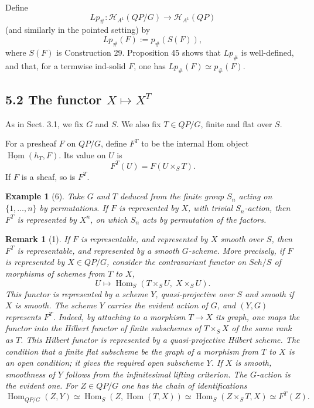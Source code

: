 \documentclass[11pt]{article}
\newcommand{\Hom}{\operatorname{Hom}}
\newcommand{\Ho}{\mathcal H}
\theoremstyle{deligne}
\newtheorem*{remark*}{Remark}
\newtheorem*{example*}{Example}
\begin{document}
Define
\[
Lp_\#:\Ho_{A^1}(QP/G)\longrightarrow \Ho_{A^1}(QP)
\]
(and similarly in the pointed setting) by
\[
Lp_\#(F):=p_\#(S(F)),
\]
where \(S(F)\) is Construction 29. Proposition 45 shows that \(Lp_\#\) is well-defined, and that, for a termwise ind-solid \(F\), one has \(Lp_\#(F)\simeq p_\#(F)\).

\subsection*{5.2 The functor \(X\mapsto X^T\)}

As in Sect. 3.1, we fix \(G\) and \(S\). We also fix \(T\in QP/G\), finite and flat over \(S\).

For a presheaf \(F\) on \(QP/G\), define \(F^T\) to be the internal Hom object \(\underline{\Hom}(h_T,F)\). Its value on \(U\) is
\[
F^T(U)=F(U\times_S T).
\]
If \(F\) is a sheaf, so is \(F^T\).

\begin{example*}[6]
Take \(G\) and \(T\) deduced from the finite group \(S_n\) acting on \(\{1,\ldots,n\}\) by permutations. If \(F\) is represented by \(X\), with trivial \(S_n\)-action, then \(F^T\) is represented by \(X^n\), on which \(S_n\) acts by permutation of the factors.
\end{example*}

\begin{remark*}[1]
If \(F\) is representable, and represented by \(X\) smooth over \(S\), then \(F^T\) is representable, and represented by a smooth \(G\)-scheme. More precisely, if \(F\) is represented by \(X\in QP/G\), consider the contravariant functor on \(Sch/S\) of morphisms of schemes from \(T\) to \(X\),
\[
U\longmapsto \Hom_S(T\times_S U,\; X\times_S U).
\]
This functor is represented by a scheme \(Y\), quasi-projective over \(S\) and smooth if \(X\) is smooth. The scheme \(Y\) carries the evident action of \(G\), and \((Y,G)\) represents \(F^T\). Indeed, by attaching to a morphism \(T\to X\) its graph, one maps the functor into the Hilbert functor of finite subschemes of \(T\times_S X\) of the same rank as \(T\). This Hilbert functor is represented by a quasi-projective Hilbert scheme. The condition that a finite flat subscheme be the graph of a morphism from \(T\) to \(X\) is an open condition; it gives the required open subscheme \(Y\). If \(X\) is smooth, smoothness of \(Y\) follows from the infinitesimal lifting criterion. The \(G\)-action is the evident one. For \(Z\in QP/G\) one has the chain of identifications
\[
\Hom_{QP/G}(Z,Y)
\simeq \Hom_S(Z,\Hom(T,X))
\simeq \Hom_S(Z\times_S T,X)
\simeq F^T(Z).
\]
\end{remark*}
\end{document}
